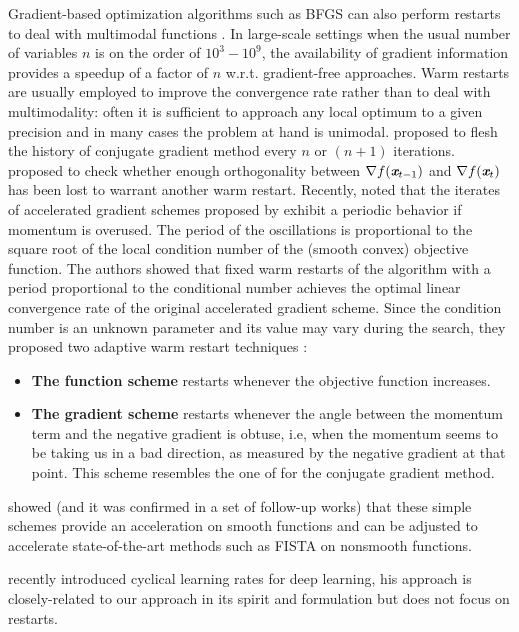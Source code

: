 \documentclass{article} %
\newcommand{\vc}[1]{\textit{\textbf{#1}}}
\begin{document}
Gradient-based optimization algorithms such as BFGS can also perform 
restarts to deal with multimodal functions \citep{ros2009benchmarking}. In large-scale settings when the usual number of variables $n$ is on the order of $10^3-10^9$, the availability of gradient information provides a speedup of a factor of $n$ w.r.t. gradient-free approaches. Warm restarts are usually employed to improve the convergence rate rather than to deal with multimodality: often it is sufficient to approach any local optimum to a given precision and in many cases the problem at hand is unimodal. 
\cite{fletcher1964function} proposed to flesh the history of conjugate gradient method every $n$ or $(n + 1)$ iterations. \cite{powell1977restart} proposed to check whether enough orthogonality between $\nabla f(\vc{x}_{t-1})$ and $\nabla f(\vc{x}_t)$ has been lost to warrant another warm restart.
Recently, \cite{o2012adaptive} noted that the iterates of accelerated gradient schemes proposed by \cite{nesterov1983method,nesterov2013introductory} exhibit a periodic behavior if momentum is  overused. The period of the oscillations is proportional to the square root of the local condition number of the (smooth convex) objective function. 
The authors showed that fixed warm restarts of the algorithm with a period proportional to the conditional number achieves the optimal linear convergence rate of the original accelerated gradient scheme. 
Since the condition number is an unknown parameter and its value may vary during the search, 
they proposed two adaptive warm restart techniques \citep{o2012adaptive}: 

\begin{itemize}
	\item \textbf{{The function scheme}} restarts whenever the objective function increases.
	\item \textbf{{The gradient scheme}} restarts whenever the angle between the	momentum term and the negative
gradient is obtuse, i.e, when the momentum seems to be taking us in a bad direction, as measured by the negative gradient at that point. This scheme resembles the one of \cite{powell1977restart} for the conjugate gradient method. 
\end{itemize}

\cite{o2012adaptive} showed (and it was confirmed in a set of follow-up works) that these simple schemes provide an acceleration on smooth functions and can be adjusted to accelerate state-of-the-art methods such as FISTA on nonsmooth functions. 

\cite{smith2015no,smith2016} recently introduced cyclical learning rates for deep learning, his approach is closely-related to our approach in its spirit and formulation but does not focus on restarts.   
\end{document}
